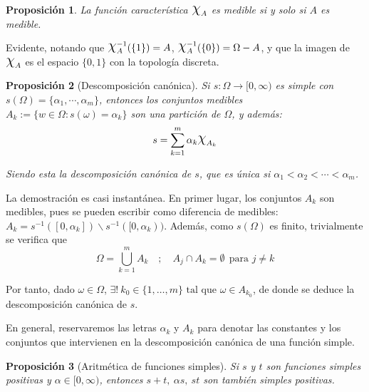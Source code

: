 \documentclass[11pt, a4paper]{article}
\makeatletter
\newif\IfInSansMode
\let\oldsf\sffamily
\renewcommand*{\sffamily}{\oldsf\mathversion{sans}\InSansModetrue}
\let\oldnorm\normalfont
\renewcommand*{\normalfont}{\oldnorm\InSansModefalse\mathversion{normal}}
\DeclareRobustCommand{\rchi}{{\Large \mathpalette\irchi\relax}}
\newcommand{\irchi}[2]{\raisebox{0.4\depth}{$#1\chi$}} %
\renewenvironment{proof}[1][\proofname] {\par\pushQED{\qed}\normalfont\topsep6\p@\@plus6\p@\relax\trivlist\item[\hskip\labelsep\itshape\sffamily#1\@addpunct{.}]\ignorespaces}{\popQED\endtrivlist\@endpefalse}
\theoremstyle{theorem-style}
\newtheorem{nprop}{Proposición}[section]
\theoremstyle{definition-style}
\theoremstyle{remark-style}
\theoremstyle{example-style}
\makeatother
\begin{document}
\begin{nprop} \label{chi} La función característica $\rchi_A$ es medible si y solo si $A$ es medible.
\end{nprop}

\begin{proof}
	Evidente, notando que $\rchi^{-1}_A(\{1\}) = A$, $\rchi^{-1}_A(\{0\}) = \Omega - A$, y que la imagen de $\rchi_A$ es el espacio $\{0,1\}$ con la topología discreta.
\end{proof}

\begin{nprop}[Descomposición canónica]
  Si $s:\Omega \to [0,\infty)$ es simple con \mbox{$s(\Omega) =  \{\alpha_1,\cdots, \alpha_m\}$}, entonces los conjuntos medibles $A_k:= \{w \in \Omega: s(\omega)= \alpha_k\}$ son una partición de $\Omega$, y además:
  \[
    s = \sum_{k=1}^m \alpha_k \rchi_{A_k}
  \]
  
  Siendo esta la descomposición canónica de $s$, que es única si $\alpha_1 < \alpha_2 <  \cdots <\alpha_m$.
\end{nprop}

\begin{proof} La demostración es casi instantánea. En primer lugar, los conjuntos $A_k$ son medibles, pues se pueden escribir como diferencia de medibles: \mbox{$A_k = s^{-1}([0,\alpha_k])\backslash s^{-1}([0,\alpha_k))$.} Además, como $s(\Omega)$ es finito, trivialmente se verifica que $$\Omega = \bigcup_{k=1}^m A_k \quad ; \quad A_j \cap A_k = \emptyset \ \ \text{para } j \ne k$$

  Por tanto, dado $\omega \in \Omega$, $\exists ! \ k_0 \in \{1,\dots,m\} \text{ tal que } \omega \in A_{k_0}$, de donde se deduce la descomposición canónica de $s$.
\end{proof}

En general, reservaremos las letras $\alpha_k$ y $A_k$ para denotar las constantes y los conjuntos que intervienen en la descomposición canónica de una función simple.


\begin{nprop}[Aritmética de funciones simples] \label{propsimples}
  Si $s$ y $t$ son funciones simples positivas y $\alpha \in [0,\infty)$, entonces $s+t, \ \alpha s, \ st$ son también simples positivas.
\end{nprop}
\end{document}
